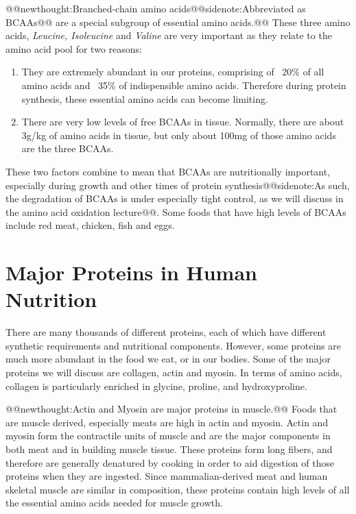 \documentclass{tufte-handout}
\makeatletter
\def\newthought#1{@@newthought:#1@@}
\def\sidenote#1{@@sidenote:#1@@}
\makeatother
\begin{document}
\newthought{Branched-chain amino acids\sidenote{Abbreviated as BCAAs\nomenclature{BCAA}{Branched-Chain Amino Acids}} are a special subgroup of essential amino acids.}  These three amino acids, \emph{Leucine, Isoleucine} and \emph{Valine} are very important as they relate to the amino acid pool for two reasons:
\begin{enumerate}
\item They are extremely abundant in our proteins, comprising of ~20\% of all amino acids and ~35\% of indispensible amino acids.  Therefore during protein synthesis, these essential amino acids can become limiting.
\item There are very low levels of free BCAAs in tissue.  Normally, there are about 3g/kg of amino acids in tissue, but only about 100mg of those amino acids are the three BCAAs.
\end{enumerate}

These two factors combine to mean that BCAAs are nutritionally important, especially during growth and other times of protein synthesis\sidenote{As such, the degradation of BCAAs is under especially tight control, as we will discuss in the amino acid oxidation lecture}.  Some foods that have  high levels of BCAAs include red meat, chicken, fish and eggs.

\section{Major Proteins in Human Nutrition}
There are many thousands of different proteins, each of which have different synthetic requirements and nutritional components.  However, some proteins are much more abundant in the food we eat, or in our bodies.  Some of the major proteins we will discuss are collagen, actin and myosin.  In terms of amino acids, collagen is particularly enriched in glycine, proline, and hydroxyproline.

\newthought{Actin and Myosin are major proteins in muscle.}  Foods that are muscle derived, especially meats are high in actin and myosin.  Actin and myosin form the contractile units of muscle and are the major components in both meat and in building muscle tissue.  These proteins form long fibers, and therefore are generally denatured by cooking in order to aid digestion of those proteins when they are ingested.  Since mammalian-derived meat and human skeletal muscle are similar in composition, these proteins contain high levels of all the essential amino acids needed for muscle growth.
\end{document}
